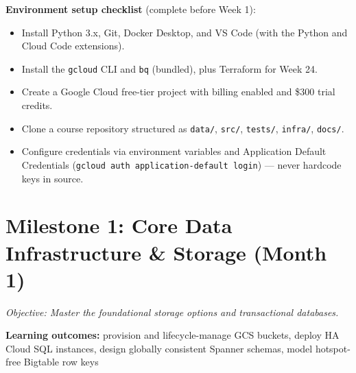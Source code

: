 \documentclass[11pt, a4paper]{article}
\begin{document}
\noindent\textbf{Environment setup checklist} (complete before Week 1):
\begin{itemize}[label=$\square$]
    \item Install Python 3.x, Git, Docker Desktop, and VS Code (with the Python and Cloud Code extensions).
    \item Install the \texttt{gcloud} CLI and \texttt{bq} (bundled), plus Terraform for Week 24.
    \item Create a Google Cloud free-tier project with billing enabled and \$300 trial credits.
    \item Clone a course repository structured as \texttt{data/}, \texttt{src/}, \texttt{tests/}, \texttt{infra/}, \texttt{docs/}.
    \item Configure credentials via environment variables and Application Default Credentials (\texttt{gcloud auth application-default login}) --- never hardcode keys in source.
\end{itemize}
\newpage

\section{Milestone 1: Core Data Infrastructure \& Storage (Month 1)}
\textit{Objective: Master the foundational storage options and transactional databases.}
\par\noindent\textbf{Learning outcomes:} provision and lifecycle-manage GCS buckets, deploy HA Cloud SQL instances, design globally consistent Spanner schemas, model hotspot-free Bigtable row keys
\end{document}
